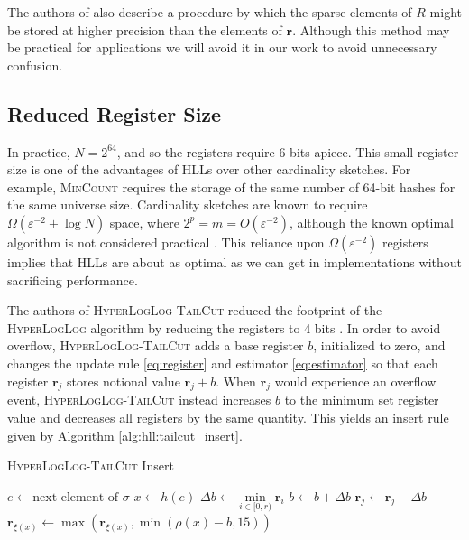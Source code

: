 \documentclass[10]{report}
\newcommand{\algoname}[1]{\textnormal{\textsc{#1}}}
\begin{document}
The authors of \cite{heule2013hyperloglog} also describe a procedure by which the sparse elements of $R$ might be stored at higher precision than the elements of $\mathbf{r}$.
Although this method may be practical for applications we will avoid it in our work to avoid unnecessary confusion.







\subsection{Reduced Register Size}
 \label{DS:sec:HLL:reduced}

In practice, $N= 2^{64}$, and so the registers require 6 bits apiece.
This small register size is one of the advantages of \algoname{HLL}s over other cardinality sketches.
For example, \algoname{MinCount} requires the storage of the same number of 64-bit hashes for the same universe size. 
Cardinality sketches are known to require $\Omega(\varepsilon^{-2} + \log N)$ space, where $2^p = m = O(\varepsilon^{-2})$, although the known optimal algorithm is not considered practical \cite{kane2010optimal}.
This reliance upon $\Omega(\varepsilon^{-2})$ registers implies that \algoname{HLL}s are about as optimal as we can get in implementations without sacrificing performance.

The authors of \algoname{HyperLogLog-TailCut} reduced the footprint of the \algoname{HyperLogLog} algorithm by reducing the registers to 4 bits \cite{xiao2017better}.
In order to avoid overflow, \algoname{HyperLogLog-TailCut} adds a base register $b$, initialized to zero, and changes the update rule \eqref{eq:register} and estimator \eqref{eq:estimator} so that each register $\mathbf{r}_j$ stores notional value $\mathbf{r}_j + b$. 
When $\mathbf{r}_j$ would experience an overflow event, \algoname{HyperLogLog-TailCut} instead increases $b$ to the minimum set register value and decreases all registers by the same quantity. 
This yields an insert rule given by Algorithm \ref{alg:hll:tailcut_insert}.
\begin{algorithm}
\caption{\algoname{HyperLogLog-TailCut} Insert}\label{alg:hll:tailcut_insert}
\begin{algorithmic}[1]
	\State $e \gets \text{next element of $\sigma$}$
	\State $x \gets h(e)$
		\State $\Delta b \gets \min\limits_{i \in [0, r)} \mathbf{r}_i$
			\State $b \gets b + \Delta b$
			\For {$j \in [0,r)$}
				\State $\mathbf{r}_j \gets \mathbf{r}_j - \Delta b$
			\EndFor
		\EndIf
	\EndIf
	\State $\mathbf{r}_{\xi(x)} \gets \max ( \mathbf{r}_{\xi(x)}, \min ( \rho(x) - b, 15))$
\end{algorithmic}
\end{algorithm}
\end{document}
